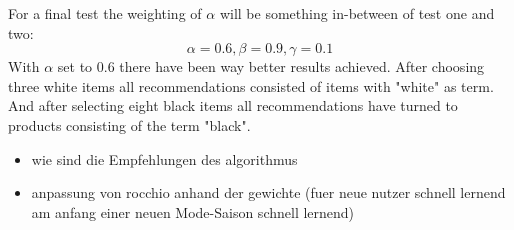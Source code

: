 \noindent
For a final test the weighting of $\alpha$ will be something in-between of test one and two:
$$\alpha = 0.6, \beta = 0.9, \gamma = 0.1$$
With $\alpha$ set to 0.6 there have been way better results achieved.
After choosing three white items all recommendations consisted of items with "white" as term.
\\
And after selecting eight black items all recommendations have turned to products consisting of the term "black".























{\color{red}
    \begin{itemize}
        \item wie sind die Empfehlungen des algorithmus
        \item anpassung von rocchio anhand der gewichte (fuer neue nutzer schnell lernend am anfang einer neuen Mode-Saison schnell lernend)
    \end{itemize}
}

